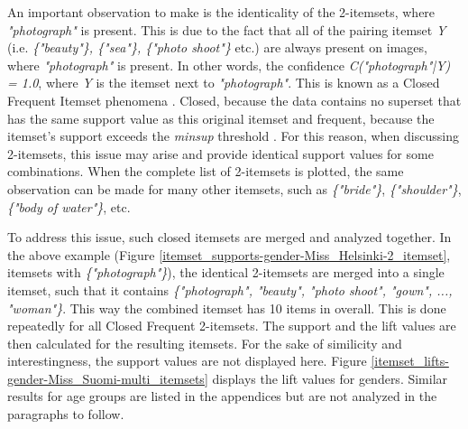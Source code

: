 An important observation to make is the identicality of the 2-itemsets, where \emph{"photograph"} is present. This is due to the fact that all of the pairing itemset \emph{Y} (i.e. \emph{\{"beauty"\}, \{"sea"\}, \{"photo shoot"\}} etc.) are always present on images, where \emph{"photograph"} is present. In other words, the confidence \emph{C("photograph"|Y) = 1.0}, where \emph{Y} is the itemset next to \emph{"photograph"}. This is known as a Closed Frequent Itemset phenomena \cite{introtodatamining}. Closed, because the data contains no superset that has the same support value as this original itemset and frequent, because the itemset's support exceeds the \emph{minsup} threshold \cite{introtodatamining}. For this reason, when discussing 2-itemsets, this issue may arise and provide identical support values for some combinations. When the complete list of 2-itemsets is plotted, the same observation can be made for many other itemsets, such as \emph{\{"bride"\}}, \emph{\{"shoulder"\}}, \emph{\{"body of water"\}}, etc. 

To address this issue, such closed itemsets are merged and analyzed together. In the above example (Figure \ref{itemset_supports-gender-Miss_Helsinki-2_itemset}, itemsets with \emph{\{"photograph"\}}), the identical 2-itemsets are merged into a single itemset, such that it contains \emph{\{"photograph", "beauty", "photo shoot", "gown", ..., "woman"\}}. This way the combined itemset has 10 items in overall. This is done repeatedly for all Closed Frequent 2-itemsets. The support and the lift values are then calculated for the resulting itemsets. For the sake of similicity and interestingness, the support values are not displayed here. Figure \ref{itemset_lifts-gender-Miss_Suomi-multi_itemsets} displays the lift values for genders. Similar results for age groups are listed in the appendices but are not analyzed in the paragraphs to follow.

